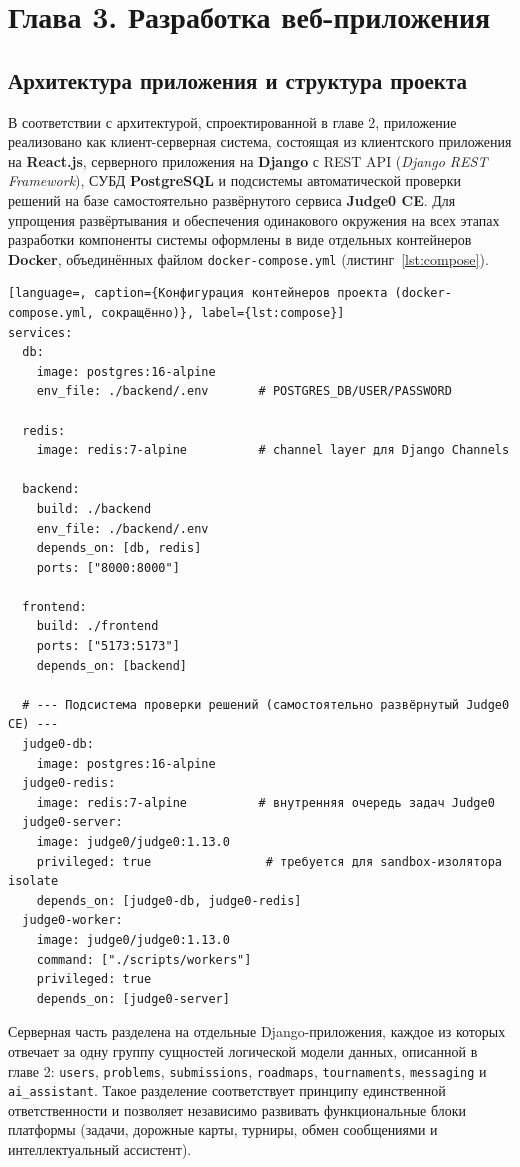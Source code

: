 \section*{Глава 3. Разработка веб-приложения}

\subsection{Архитектура приложения и структура проекта}

В соответствии с архитектурой, спроектированной в главе 2, приложение
реализовано как клиент-серверная система, состоящая из клиентского
приложения на \textbf{React.js}, серверного приложения на
\textbf{Django} с REST API (\textit{Django REST Framework}), СУБД
\textbf{PostgreSQL} и подсистемы автоматической проверки решений на базе
самостоятельно развёрнутого сервиса \textbf{Judge0 CE}. Для упрощения
развёртывания и обеспечения одинакового окружения на всех этапах
разработки компоненты системы оформлены в виде отдельных контейнеров
\textbf{Docker}, объединённых файлом \texttt{docker-compose.yml}
(листинг~\ref{lst:compose}).

\begin{lstlisting}[language=, caption={Конфигурация контейнеров проекта (docker-compose.yml, сокращённо)}, label={lst:compose}]
services:
  db:
    image: postgres:16-alpine
    env_file: ./backend/.env       # POSTGRES_DB/USER/PASSWORD

  redis:
    image: redis:7-alpine          # channel layer для Django Channels

  backend:
    build: ./backend
    env_file: ./backend/.env
    depends_on: [db, redis]
    ports: ["8000:8000"]

  frontend:
    build: ./frontend
    ports: ["5173:5173"]
    depends_on: [backend]

  # --- Подсистема проверки решений (самостоятельно развёрнутый Judge0 CE) ---
  judge0-db:
    image: postgres:16-alpine
  judge0-redis:
    image: redis:7-alpine          # внутренняя очередь задач Judge0
  judge0-server:
    image: judge0/judge0:1.13.0
    privileged: true                # требуется для sandbox-изолятора isolate
    depends_on: [judge0-db, judge0-redis]
  judge0-worker:
    image: judge0/judge0:1.13.0
    command: ["./scripts/workers"]
    privileged: true
    depends_on: [judge0-server]
\end{lstlisting}

Серверная часть разделена на отдельные Django-приложения, каждое из
которых отвечает за одну группу сущностей логической модели данных,
описанной в главе 2: \texttt{users}, \texttt{problems},
\texttt{submissions}, \texttt{roadmaps}, \texttt{tournaments},
\texttt{messaging} и \texttt{ai\_assistant}. Такое разделение
соответствует принципу единственной ответственности и позволяет
независимо развивать функциональные блоки платформы (задачи, дорожные
карты, турниры, обмен сообщениями и интеллектуальный ассистент).

